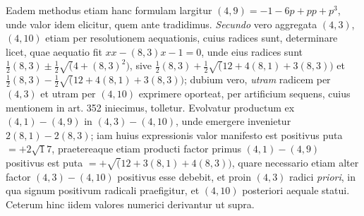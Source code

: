 Eadem methodus etiam hanc formulam largitur \((4,9)=-1-6p+pp+p^3\), unde valor idem elicitur, quem ante tradidimus. \textit{Secundo} vero aggregata \((4,3)\), \((4,10)\) etiam per resolutionem aequationis, cuius radices sunt, determinare licet, quae aequatio fit \(xx-(8,3)x-1=0\), unde eius radices sunt \(\frac12(8,3)\pm\frac12\surd(4+(8,3)^2)\), sive \(\frac12(8,3)+\frac12\surd(12+4(8,1)+3(8,3))\) et \(\frac12(8,3)-\frac12\surd(12+4(8,1)+3(8,3))\); dubium vero, \textit{utram} radicem per \((4,3)\) et utram per \((4,10)\) exprimere oporteat, per artificium sequens, cuius mentionem in art. 352 iniecimus, tolletur. Evolvatur productum ex \((4,1)-(4,9)\) in \((4,3)-(4,10)\), unde emergere invenietur \(2(8,1)-2(8,3)\); iam huius expressionis valor manifesto est positivus puta \(=+2\surd 17\), praetereaque etiam producti factor primus \((4,1)-(4,9)\) positivus est puta \(=+\surd(12+3(8,1)+4(8,3))\), quare necessario etiam alter factor \((4,3)-(4,10)\) positivus esse debebit, et proin \((4,3)\) radici \textit{priori}, in qua signum positivum radicali praefigitur, et \((4,10)\) posteriori aequale statui. Ceterum hinc iidem valores numerici derivantur ut supra.

